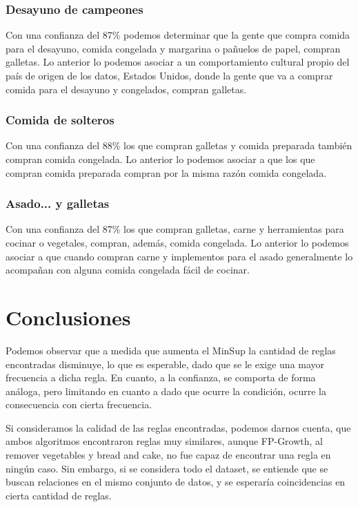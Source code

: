 \documentclass{article}
\begin{document}
\subsubsection*{Desayuno de campeones}

Con una confianza del 87\% podemos determinar que la gente que compra comida para el desayuno, comida congelada y margarina o pañuelos de papel, compran galletas. Lo anterior lo podemos asociar a un comportamiento cultural propio del país de origen de los datos, Estados Unidos, donde la gente que va a comprar comida para el desayuno y congelados, compran galletas.

\subsubsection*{Comida de solteros}

Con una confianza del 88\% los que compran galletas y comida preparada también compran comida congelada. Lo anterior lo podemos asociar a que los que compran comida preparada compran por la misma razón comida congelada.

\subsubsection*{Asado... y galletas}

Con una confianza del 87\% los que compran galletas, carne y  herramientas para cocinar o vegetales, compran, además, comida congelada. Lo anterior lo podemos asociar a que cuando compran carne y implementos para el asado generalmente lo acompañan con alguna comida congelada fácil de cocinar.



\section{Conclusiones}
Podemos observar que a medida que aumenta el MinSup la cantidad de reglas encontradas disminuye, lo que es esperable, dado que se le exige una mayor frecuencia a dicha regla. En cuanto, a la confianza, se comporta de forma análoga, pero limitando en cuanto a dado que ocurre la condición, ocurre la consecuencia con cierta frecuencia.

Si consideramos la calidad de las reglas encontradas, podemos darnos cuenta, que ambos algoritmos encontraron reglas muy similares, aunque FP-Growth, al remover vegetables y bread and cake, no fue capaz de encontrar una regla en ningún caso. Sin embargo, si se considera todo el dataset, se entiende que se buscan relaciones en el mismo conjunto de datos, y se esperaría coincidencias en cierta cantidad de reglas.
\end{document}
